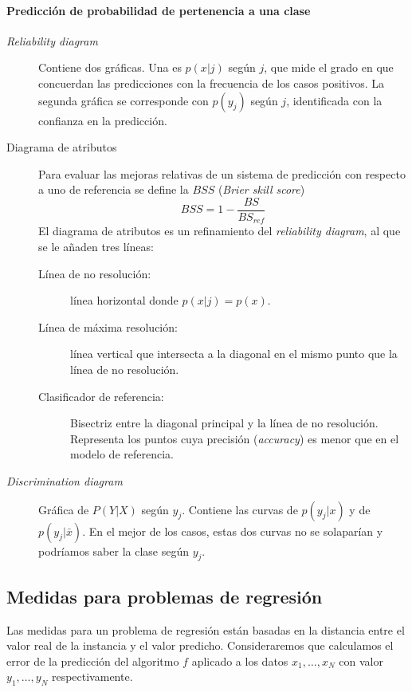 \paragraph{Predicción de probabilidad de pertenencia a una clase} 	
	\begin{description}
		\item[\textit{Reliability diagram}] Contiene dos
		gráficas. Una es $p(x|j)$ según $j$, que mide el 
		grado en que concuerdan las predicciones con la
		frecuencia de los casos positivos. La segunda gráfica 
		se corresponde con $p(y_j)$ según $j$, identificada 
		con la confianza en la predicción.
		\item[Diagrama de atributos] Para evaluar las mejoras 
		relativas de un sistema de predicción con respecto a 
		uno de referencia se define la $BSS$ (\textit{Brier 
		skill score})
			\[BSS = 1 - \frac{BS}{BS_{ref}} \]
		El diagrama de atributos es un refinamiento del
		\textit{reliability diagram}, al que se le añaden 
		tres líneas: 
			\begin{description}
			\item[Línea de no resolución:] línea horizontal 
			donde $p(x|j)=p(x)$.
			\item[Línea de máxima resolución:] línea vertical 
			que intersecta a la diagonal en el mismo punto 
			que la línea de no resolución.
			\item[Clasificador de referencia:] Bisectriz 
			entre la diagonal principal y la línea de no 
			resolución. Representa los puntos cuya precisión 
			(\textit{accuracy}) es menor que en el modelo de 
			referencia.
			\end{description}
		\item[\textit{Discrimination diagram}] Gráfica de 
		$P(Y|X)$ según $y_j$. Contiene las curvas de 
		$p(y_j|x)$ y de $p(y_j|\bar{x})$. En el mejor de los 
		casos, estas dos curvas no se solaparían y podríamos 
		saber la clase según $y_j$.
	\end{description}
	
	
\subsection*{Medidas para problemas de regresión}

	Las medidas para un problema de regresión están basadas 
en la distancia entre el valor real de la instancia y el 
valor predicho. Consideraremos que calculamos el error de la 
predicción del algoritmo $f$ aplicado a los datos $x_1, 
\dots, x_N$ con valor $y_1, \dots, y_N$ respectivamente.
	
